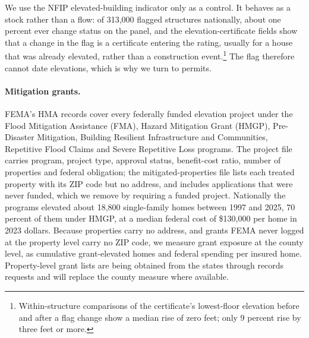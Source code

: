 We use the NFIP elevated-building indicator only as a control. It behaves as a stock rather
than a flow: of 313,000 flagged structures nationally, about one percent ever change status
on the panel, and the elevation-certificate fields show that a change in the flag is a
certificate entering the rating, usually for a house that was already elevated, rather than a
construction event.\footnote{Within-structure comparisons of the certificate's lowest-floor
elevation before and after a flag change show a median rise of zero feet; only 9 percent rise
by three feet or more.} The flag therefore cannot date elevations, which is why we turn to
permits.

\paragraph{Mitigation grants.}
FEMA's HMA records cover every federally funded elevation project under the Flood Mitigation
Assistance (FMA), Hazard Mitigation Grant (HMGP), Pre-Disaster Mitigation, Building Resilient
Infrastructure and Communities, Repetitive Flood Claims and Severe Repetitive Loss programs.
The project file carries program, project type, approval status, benefit-cost ratio, number of
properties and federal obligation; the mitigated-properties file lists each treated property
with its ZIP code but no address, and includes applications that were never funded, which we
remove by requiring a funded project. Nationally the programs elevated about 18,800
single-family homes between 1997 and 2025, 70 percent of them under HMGP, at a median federal
cost of \$130,000 per home in 2023 dollars. Because properties carry no address, and grants FEMA never logged at the
property level carry no ZIP code, we measure grant exposure at the county level, as cumulative grant-elevated
homes and federal spending per insured home. Property-level grant lists are being obtained
from the states through records requests and will replace the county measure where available.

